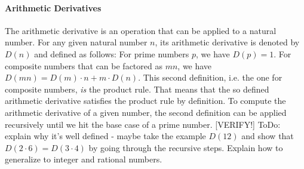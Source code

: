 
\paragraph{Arithmetic Derivatives} The arithmetic derivative is an operation that can be applied to a natural number. For any given natural number $n$, its arithmetic derivative is denoted by $D(n)$ and defined as follows: For prime numbers $p$, we have $D(p) = 1$. For composite numbers that can be factored as $m n$, we have $D(m n) = D(m) \cdot n + m \cdot D(n)$. This second definition, i.e. the one for composite numbers, \emph{is} the product rule. That means that the so defined arithmetic derivative satisfies the product rule by definition. To compute the arithmetic derivative of a given number, the second definition can be applied recursively until we hit the base case of a prime number. [VERIFY!] ToDo: explain why it's well defined - maybe take the example $D(12)$ and show that $D(2 \cdot 6) = D(3 \cdot 4)$ by going through the recursive steps. Explain how to generalize to integer and rational numbers.




